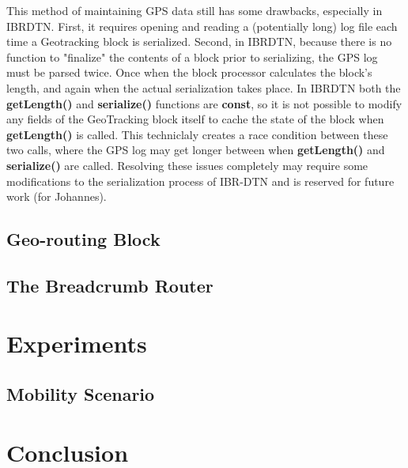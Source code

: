 \documentclass{sig-alternate}
\begin{document}
This method of maintaining GPS data still has some drawbacks, especially in IBRDTN.  First, it requires opening and reading a (potentially long) log file each time a Geotracking block is serialized.  Second, in IBRDTN, because there is no function to "finalize" the contents of a block prior to serializing, the GPS log must be parsed twice.  Once when the block processor calculates the block's length, and again when the actual serialization takes place.  In IBRDTN both the {\bf getLength()} and {\bf serialize()} functions are {\bf const}, so it is not possible to modify any fields of the GeoTracking block itself to cache the state of the block when {\bf getLength()} is called.  This techniclaly creates a race condition between these two calls, where the GPS log may get longer between when {\bf getLength()} and {\bf serialize()} are called.  Resolving these issues completely may require some modifications to the serialization process of IBR-DTN and is reserved for future work (for Johannes).


\subsection{Geo-routing Block}

\subsection{The Breadcrumb Router}


%
%
\section{Experiments}

\subsection{Mobility Scenario}



%
%
\section{Conclusion}
\end{document}
